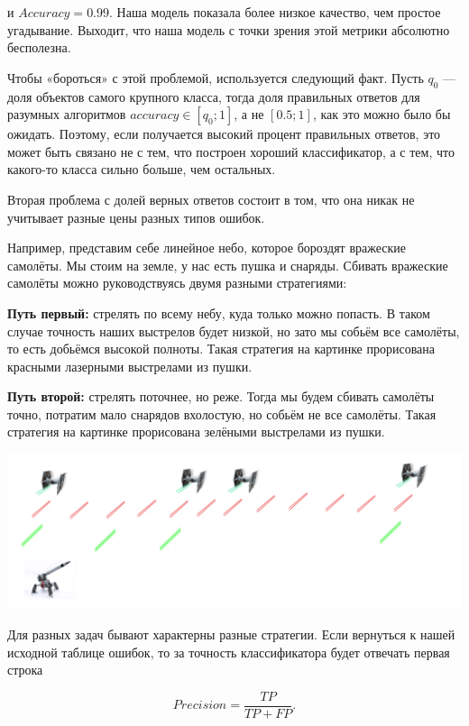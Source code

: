 \documentclass[12pt, a4paper, oneside]{article}
\theoremstyle{plain} %
\theoremstyle{definition}
\begin{document}
\begin{solution}
\begin{enumerate}
		и $Accuracy = 0.99$. Наша модель показала более низкое качество, чем простое угадывание. Выходит, что наша модель с точки зрения этой метрики абсолютно бесполезна. 
		
		Чтобы «бороться» с этой проблемой, используется следующий факт. Пусть $q_0$ — доля объектов самого крупного класса, тогда доля правильных ответов для разумных алгоритмов $accuracy \in [q_0; 1]$, а не $[0.5; 1]$, как это можно было бы ожидать. Поэтому, если получается высокий процент правильных ответов, это может быть связано не с тем, что построен хороший классификатор, а с тем, что какого-то класса сильно больше, чем остальных.
		
		Вторая проблема с долей верных ответов состоит в том, что она никак не учитывает разные цены разных типов ошибок.
		
		Например, представим себе линейное небо, которое бороздят вражеские самолёты. Мы стоим на земле, у нас есть пушка и снаряды. Сбивать вражеские самолёты можно руководствуясь двумя разными стратегиями: 
		
		\textbf{Путь первый:}  стрелять по всему небу, куда только можно попасть. В таком случае точность наших выстрелов будет низкой, но зато мы собьём все самолёты, то есть добьёмся высокой полноты. Такая стратегия на картинке прорисована красными лазерными выстрелами из пушки.
		
		\textbf{Путь второй:} стрелять поточнее, но реже. Тогда мы будем сбивать самолёты точно, потратим мало снарядов вхолостую, но собьём не все самолёты. Такая стратегия на картинке прорисована зелёными выстрелами из пушки. 
		
		\begin{center}
			\includegraphics[width=.79\paperwidth]{fly.png}
		\end{center}
		
		Для разных задач бывают характерны разные стратегии. Если вернуться к нашей исходной таблице ошибок, то за точность классификатора будет отвечать первая строка
		
		\[ 
		Precision = \frac{TP}{TP + FP}.
		\]
		

\end{enumerate}
\end{solution}
\end{document}
